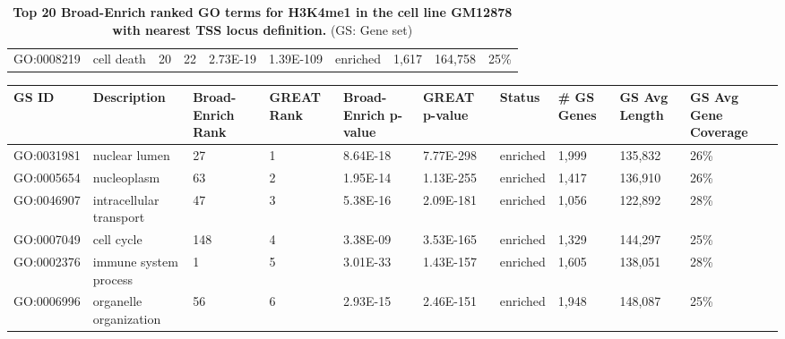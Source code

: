 \begin{sidewaystable}[!ht]
\begin{tabular}{lp{2cm}p{1cm}p{1cm}p{1.25cm}p{1.25cm}p{1cm}p{1.25cm}p{1.25cm}p{1.25cm}}
GO:0008219 & cell death                                     & 20                & 22         & 2.73E-19             & 1.39E-109     & enriched & 1,617       & 164,758       & 25\%
\end{tabular}
\normalsize
\caption[Top 20 Broad-Enrich ranked GO terms for H3K4me1 in the cell line GM12878 with nearest TSS locus definition.]
{
\textbf{Top 20 Broad-Enrich ranked GO terms for H3K4me1 in the cell line GM12878 with nearest TSS locus definition.}
(GS: Gene set)
}
\label{chap2:table:7}

\end{sidewaystable}

\newpage

\begin{sidewaystable}[!ht]
\tiny
\centering
\begin{tabular}{lp{2cm}p{1cm}p{1cm}p{1.25cm}p{1.25cm}p{1cm}p{1.25cm}p{1.25cm}p{1.25cm}}
\textbf{GS ID}      & \textbf{Description}                                    & \textbf{Broad-Enrich Rank} & \textbf{GREAT Rank} & \textbf{Broad-Enrich p-value} & \textbf{GREAT p-value} & \textbf{Status}   & \textbf{\# GS Genes} & \textbf{GS Avg Length} & \textbf{GS Avg Gene Coverage} \\\hline
GO:0031981 & nuclear lumen                           & 27                & 1          & 8.64E-18             & 7.77E-298     & enriched & 1,999       & 135,832       & 26\%                 \\
GO:0005654 & nucleoplasm                             & 63                & 2          & 1.95E-14             & 1.13E-255     & enriched & 1,417       & 136,910       & 26\%                 \\
GO:0046907 & intracellular transport                 & 47                & 3          & 5.38E-16             & 2.09E-181     & enriched & 1,056       & 122,892       & 28\%                 \\
GO:0007049 & cell cycle                              & 148               & 4          & 3.38E-09             & 3.53E-165     & enriched & 1,329       & 144,297       & 25\%                 \\
GO:0002376 & immune system process                   & 1                 & 5          & 3.01E-33             & 1.43E-157     & enriched & 1,605       & 138,051       & 28\%                 \\
GO:0006996 & organelle organization                  & 56                & 6          & 2.93E-15             & 2.46E-151     & enriched & 1,948       & 148,087       & 25\%                 \\

\end{tabular}
\end{sidewaystable}
